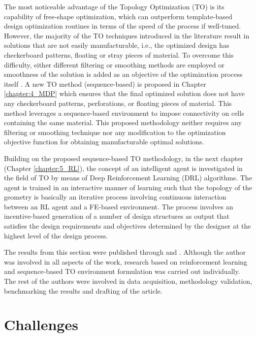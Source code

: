 The most noticeable advantage of the Topology Optimization (TO) is its capability of free-shape optimization, which can outperform template-based design optimization routines in terms of the speed of the process if well-tuned. 
However, the majority of the TO techniques introduced in the literature result in solutions that are not easily manufacturable, i.e., the optimized design has checkerboard patterns, floating or stray pieces of material.
To overcome this difficulty, either different filtering or smoothing methods are employed \parencite{campelo2008} or smoothness of the solution is added as an objective of the optimization process itself \parencite{dupre2014ant}. A new TO method (sequence-based) is proposed in Chapter \ref{chapter:4_MDP} which ensures that the final optimized solution does not have any checkerboard patterns, perforations, or floating pieces of material. This method leverages a sequence-based environment to impose connectivity on cells containing the same material. This proposed methodology neither requires any filtering or smoothing technique nor any modification to the optimization objective function for obtaining manufacturable optimal solutions. 

Building on the proposed sequence-based TO methodology, in the next chapter (Chapter \ref{chapter:5_RL}), the concept of an intelligent agent is investigated in the field of TO by means of Deep Reinforcement Learning (DRL) algorithms. The agent is trained in an interactive manner of learning such that the topology of the geometry is basically an iterative process involving continuous interaction between an RL agent and a FE-based environment. The process involves an incentive-based generation of a number of design structures as output that satisfies the design requirements and objectives determined by the designer at the highest level of the design process. 

The results from this section were published through \cite{khan2020sequence} and \cite{khan2020machine}. Although the author was involved in all aspects of the work, research based on reinforcement learning and sequence-based TO environment formulation was carried out individually. The rest of the authors were involved in data acquisition, methodology validation, benchmarking the results and drafting of the article.

\section{Challenges}

